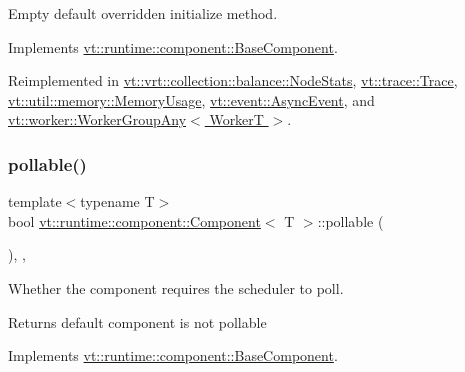 Empty default overridden initialize method. 



Implements \hyperlink{structvt_1_1runtime_1_1component_1_1_base_component_ae361291ee8a37325580e59fb4030bc3a}{vt\+::runtime\+::component\+::\+Base\+Component}.



Reimplemented in \hyperlink{structvt_1_1vrt_1_1collection_1_1balance_1_1_node_stats_a0c60d1566daa6465f56b09e27058d6a1}{vt\+::vrt\+::collection\+::balance\+::\+Node\+Stats}, \hyperlink{structvt_1_1trace_1_1_trace_a24019edd964c0a307008f8d6a0f1f825}{vt\+::trace\+::\+Trace}, \hyperlink{structvt_1_1util_1_1memory_1_1_memory_usage_add66c6cdabed24194310380c5a28951a}{vt\+::util\+::memory\+::\+Memory\+Usage}, \hyperlink{structvt_1_1event_1_1_async_event_ac8d9f977b1cca3f43a06d0e83bc88e3d}{vt\+::event\+::\+Async\+Event}, and \hyperlink{structvt_1_1worker_1_1_worker_group_any_ad8bb855b98bf26337ca13df2bff5fb95}{vt\+::worker\+::\+Worker\+Group\+Any$<$ Worker\+T $>$}.

\mbox{\label{structvt_1_1runtime_1_1component_1_1_component_a5a15bd0369a9d3765a6c70249bada96f}} 
\subsubsection{\texorpdfstring{pollable()}{pollable()}}
{\footnotesize\ttfamily template$<$typename T$>$ \\
bool \hyperlink{structvt_1_1runtime_1_1component_1_1_component}{vt\+::runtime\+::component\+::\+Component}$<$ T $>$\+::pollable (\begin{DoxyParamCaption}{ }\end{DoxyParamCaption})\hspace{0.3cm}{\ttfamily [inline]}, {\ttfamily [override]}, {\ttfamily [virtual]}}



Whether the component requires the scheduler to poll. 

\begin{DoxyReturn}{Returns}
default component is not pollable 
\end{DoxyReturn}


Implements \hyperlink{structvt_1_1runtime_1_1component_1_1_base_component_ab651a49e6d4d3d8ca9e82a6b4b10af66}{vt\+::runtime\+::component\+::\+Base\+Component}.



